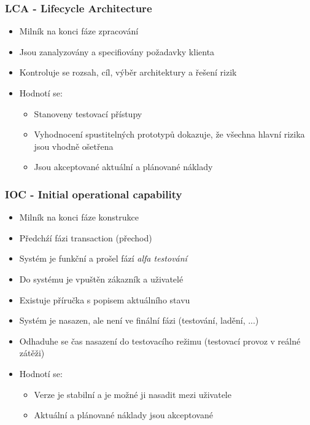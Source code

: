       \subsubsection{LCA - Lifecycle Architecture}
        \begin{itemize}
          \item Milník na konci fáze zpracování
          \item Jsou zanalyzovány a specifiovány požadavky klienta
          \item Kontroluje se rozsah, cíl, výběr architektury a řešení rizik
          \item Hodnotí se:
            \begin{itemize}
              \item Stanoveny testovací přístupy
              \item Vyhodnocení spustitelných prototypů dokazuje, že všechna hlavní rizika jsou vhodně ošetřena
              \item Jsou akceptované aktuální a plánované náklady
            \end{itemize}
        \end{itemize}

      \subsubsection{IOC - Initial operational capability}
        \begin{itemize}
          \item Milník na konci fáze konstrukce
          \item Předchźí fázi transaction (přechod)
          \item Systém je funkční a prošel fází \emph{alfa testování}
          \item Do systému je vpuštěn zákazník a uživatelé
          \item Existuje příručka s popisem aktuálního stavu
          \item Systém je nasazen, ale není ve finální fázi (testování, ladění, ...)
          \item Odhaduhe se čas nasazení do testovacího režimu (testovací provoz v reálné zátěži)
          \item Hodnotí se:
            \begin{itemize}
              \item Verze je stabilní a je možné ji nasadit mezi uživatele
              \item Aktuální a plánované náklady jsou akceptované
            \end{itemize}
        \end{itemize}
